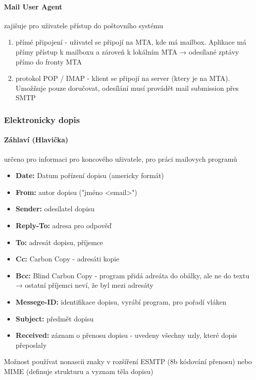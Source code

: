 \documentclass[10pt,a4paper]{article}
\begin{document}
\paragraph{Mail User Agent} zajišuje pro uživatele přístup do poštovního systému

\begin{enumerate}
    \item přímé připojení - uživatel se připojí na MTA, kde má mailbox. Aplikace má přímy přístup k mailboxu a zároveň k lokálním MTA → odesílané zptávy přímo do fronty MTA
    \item protokol POP / IMAP - klient se připojí na server (ktery je na MTA). Umožňuje pouze doručovat, odesílání musí provádět mail submission přes SMTP
\end{enumerate}

\subsubsection{Elektronicky dopis}

\paragraph{Záhlaví (Hlavička)} určeno pro informaci pro koncového uživatele, pro práci mailovych programů
\begin{itemize}
    \item \textbf{Date:} Datum pořízení dopisu (americky formát)
    \item \textbf{From:} autor dopisu ("jméno <email>")
    \item \textbf{Sender:} odesílatel dopisu
    \item \textbf{Reply-To:} adresa pro odpověď
    \item \textbf{To:} adresát dopisu, příjemce
    \item \textbf{Cc:} Carbon Copy - adresáti kopie
    \item \textbf{Bcc:} Blind Carbon Copy - program přidá adreáta do obálky, ale ne do textu → ostatní příjemci neví, že byl mezi adresáty
    \item \textbf{Messege-ID:} identifikace dopisu, vyrábí program, pro pořadí vláken
    \item \textbf{Subject:} předmět dopisu
    \item \textbf{Received:} záznam o přenosu dopisu - uvedeny všechny uzly, které dopis přeposlaly
\end{itemize}

Možnost používat nonascii znaky v rozšíření ESMTP (8b kódování přenosu) nebo MIME (definuje strukturu a vyznam těla dopisu)
\end{document}
